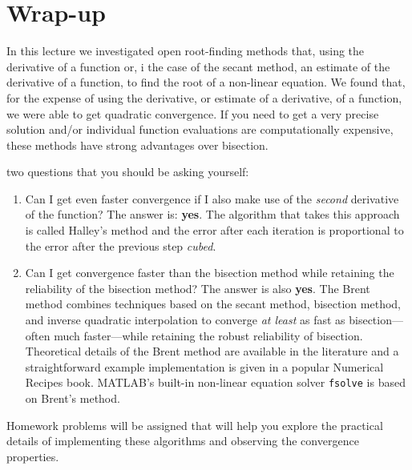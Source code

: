 \section{Wrap-up}
In this lecture we investigated open root-finding methods that, using the derivative of a function or, i the case of the secant method, an estimate of the derivative of a function, to find the root of a non-linear equation.  We found that, for the expense of using the derivative, or estimate of a derivative, of a function, we were able to get quadratic convergence.  If you need to get a very precise solution and/or individual function evaluations are computationally expensive, these methods have strong advantages over bisection.  

 two questions that you should be asking yourself:
\begin{enumerate}
\item Can I get even faster convergence if I also make use of the \emph{second} derivative of the function?  The answer is: \textbf{yes}.  The algorithm that takes this approach is called Halley's method\cite{gander1985halley} and the error after each iteration is proportional to the error after the previous step \emph{cubed}.

\item Can I get convergence faster than the bisection method while retaining the reliability of the bisection method?  The answer is also \textbf{yes}.  The Brent method combines techniques based on the secant method, bisection method, and inverse quadratic interpolation to converge \emph{at least} as fast as bisection---often much faster---while retaining the robust reliability of bisection.  Theoretical details of the Brent method are available in the literature\cite{forsythe1977computer} and a straightforward example implementation is given in a popular Numerical Recipes\cite{press1988numerical} book.  MATLAB's built-in non-linear equation solver \lstinline[style=myMatlab]{fsolve} is based on Brent's method.

\end{enumerate}
Homework problems will be assigned that will help you explore the practical details of implementing these algorithms and observing the convergence properties.
